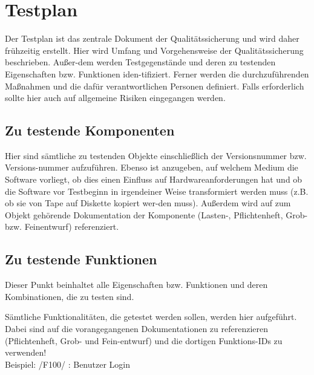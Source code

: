 
\chapter{Testplan}
Der Testplan ist das zentrale Dokument der Qualitätssicherung und wird daher
frühzeitig erstellt. Hier wird Umfang und Vorgehensweise der Qualitätssicherung
beschrieben. Außer-dem werden Testgegenstände und deren zu testenden
Eigenschaften bzw. Funktionen iden-tifiziert. Ferner werden die
durchzuführenden Maßnahmen und die dafür verantwortlichen Personen definiert.
Falls erforderlich sollte hier auch auf allgemeine Risiken eingegangen werden.

\section{Zu testende Komponenten}
Hier sind sämtliche zu testenden Objekte einschließlich der Versionsnummer bzw.
Versions-nummer aufzuführen. Ebenso ist anzugeben, auf welchem Medium die
Software vorliegt, ob dies einen Einfluss auf Hardwareanforderungen hat und ob
die Software vor Testbeginn in irgendeiner Weise transformiert werden muss
(z.B. ob sie von Tape auf Diskette kopiert wer-den muss). Außerdem wird auf zum
Objekt gehörende Dokumentation der Komponente (Lasten-, Pflichtenheft, Grob-
bzw. Feinentwurf) referenziert.

\section{Zu testende Funktionen}
Dieser Punkt beinhaltet alle Eigenschaften bzw. Funktionen und deren
Kombinationen, die zu testen sind.

Sämtliche Funktionalitäten, die getestet werden sollen, werden hier aufgeführt.
Dabei sind auf die vorangegangenen Dokumentationen zu referenzieren
(Pflichtenheft, Grob- und Fein-entwurf) und die dortigen Funktions-IDs zu
verwenden!\\ Beispiel: /F100/ : Benutzer Login

